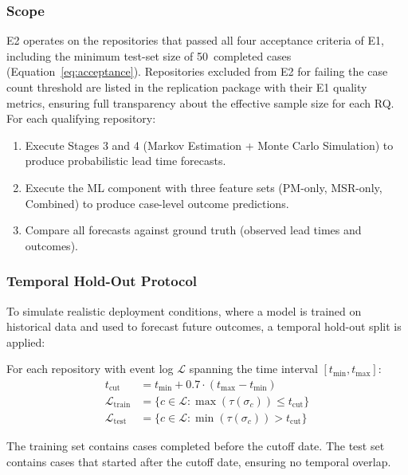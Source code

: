 \subsubsection{Scope}

E2 operates on the repositories that passed all four acceptance
criteria of E1, including the minimum test-set size of 50~completed
cases (Equation~\ref{eq:acceptance}). Repositories excluded from E2
for failing the case count threshold are listed in the replication
package with their E1 quality metrics, ensuring full transparency
about the effective sample size for each RQ. For each qualifying
repository:

\begin{enumerate}
    \item Execute Stages 3 and 4 (Markov Estimation + Monte Carlo
    Simulation) to produce probabilistic lead time forecasts.

    \item Execute the ML component with three feature sets (PM-only,
    MSR-only, Combined) to produce case-level outcome predictions.

    \item Compare all forecasts against ground truth (observed lead
    times and outcomes).
\end{enumerate}

\subsubsection{Temporal Hold-Out Protocol}
\label{sec:temporal-holdout}

To simulate realistic deployment conditions, where a model is trained 
on historical data and used to forecast future outcomes, a temporal 
hold-out split is applied:

\begin{definition}
\label{def:temporal-holdout}
For each repository with event log $\mathcal{L}$ spanning the time 
interval $[t_{\min}, t_{\max}]$:
\begin{align}
t_{\text{cut}} &= t_{\min} + 0.7 \cdot (t_{\max} - t_{\min}) 
    \label{eq:cutoff} \\
\mathcal{L}_{\text{train}} &= \{c \in \mathcal{L} : 
    \max(\tau(\sigma_c)) \leq t_{\text{cut}}\} 
    \label{eq:train-set} \\
\mathcal{L}_{\text{test}} &= \{c \in \mathcal{L} : 
    \min(\tau(\sigma_c)) > t_{\text{cut}}\} 
    \label{eq:test-set}
\end{align}

The training set contains cases completed before the cutoff date. The 
test set contains cases that started after the cutoff date, ensuring 
no temporal overlap.
\end{definition}

